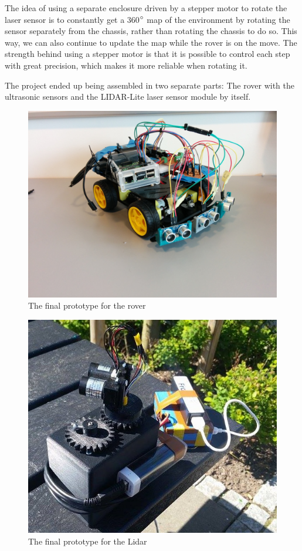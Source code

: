 The idea of using a separate enclosure driven by a stepper motor to rotate the laser sensor is to constantly get a 360$\degree$ map of the environment by rotating the sensor separately from the chassis, rather than rotating the chassis to do so. This way, we can also continue to update the map while the rover is on the move. The strength behind using a stepper motor is that it is possible to control each step with great precision, which makes it more reliable when rotating it.

The project ended up being assembled in two separate parts: The rover with the ultrasonic sensors and the LIDAR-Lite laser sensor module by itself.

\begin{figure}[H]
	\centering
	\includegraphics[width=.6\linewidth]{images/build_ultrasonic.jpg}
	\caption{The final prototype for the rover}
	\label{rover_prototype_pic}
\end{figure}

\begin{figure}[H]
	\centering
	\includegraphics[width=.6\linewidth]{images/lidarpi.jpg}
	\caption{The final prototype for the Lidar}
	\label{lidar_prototype_pic}
\end{figure}